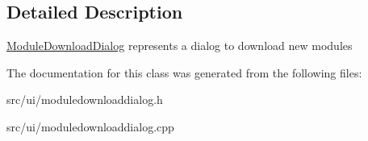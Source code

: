 \subsection{Detailed Description}
\hyperlink{classModuleDownloadDialog}{ModuleDownloadDialog} represents a dialog to download new modules 

The documentation for this class was generated from the following files:\begin{CompactItemize}
\item 
src/ui/moduledownloaddialog.h\item 
src/ui/moduledownloaddialog.cpp\end{CompactItemize}
